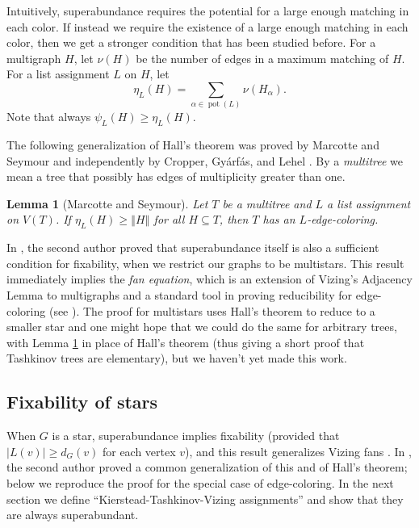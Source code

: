 \documentclass[12pt]{article}
\theoremstyle{plain}
\newtheorem{lem}[thm]{Lemma}
\theoremstyle{definition}
\theoremstyle{remark}
\newcommand{\size}[1]{\left\Vert#1\right\Vert}
\newcommand{\pot}{\operatorname{pot}}
\begin{document}
Intuitively, superabundance requires the potential for a large enough matching
in each color. If instead we require the existence of a large enough matching
in each color, then we get a stronger condition that has been studied before.
For a multigraph $H$, let $\nu(H)$ be the number of edges in a maximum matching
of $H$.  For a list assignment $L$ on $H$, let 
$$\eta_L(H) = \sum_{\alpha \in \pot(L)} \nu(H_\alpha).$$  
Note that always $\psi_L(H) \ge \eta_L(H)$.

The following generalization of Hall's theorem was proved by Marcotte and
Seymour \cite{marcotte1990extending} and independently by Cropper,
Gy{\'a}rf{\'a}s, and Lehel \cite{cropper2003edge}.  By a \emph{multitree} we
mean a tree that possibly has edges of multiplicity greater than one.

\begin{lem}[Marcotte and Seymour]\label{MultiTreeHall}
Let $T$ be a multitree and $L$ a list assignment on $V(T)$.  If $\eta_L(H) \ge
\size{H}$ for all $H \subseteq T$, then $T$ has an $L$-edge-coloring.
\end{lem}

In \cite{HallGame}, the second author proved that superabundance itself is also a
sufficient condition for fixability, when we restrict our graphs to be
multistars.  This result immediately implies the \emph{fan equation}, which is
an extension of Vizing's Adjacency Lemma to multigraphs and a standard tool in
proving reducibility for edge-coloring (see \cite[p.~19ff]{stiebitz2012graph}).
 The proof for multistars uses Hall's
theorem to reduce to a smaller star and one might hope that we could do the
same for arbitrary trees, with Lemma \ref{MultiTreeHall} in place of Hall's
theorem (thus giving a short proof that Tashkinov trees are elementary), but we
haven't yet made this work.

\subsection{Fixability of stars}
When $G$ is a star, superabundance implies fixability (provided that $|L(v)|\ge
d_G(v)$ for each vertex $v$), and this result generalizes Vizing fans
\cite{Vizing76}.  In \cite{HallGame}, the second author proved a
common generalization of %
this and of Hall's theorem; below we reproduce the proof for the special case
of edge-coloring.  In the next section we define ``Kierstead-Tashkinov-Vizing
assignments'' and show that they are always superabundant.  
\end{document}
